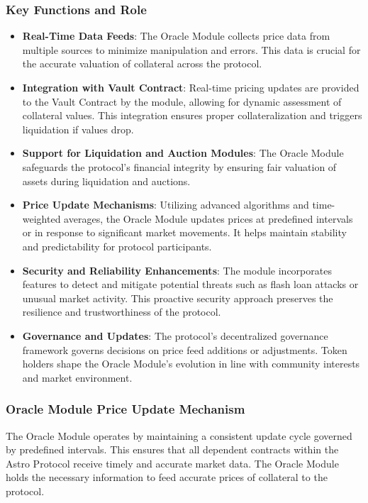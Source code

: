 \subsubsection{Key Functions and Role}
\begin{itemize}
    \item \textbf{Real-Time Data Feeds}: The Oracle Module collects price data from multiple sources to minimize manipulation and errors. This data is crucial for the accurate valuation of collateral across the protocol.
    \item \textbf{Integration with Vault Contract}: Real-time pricing updates are provided to the Vault Contract by the module, allowing for dynamic assessment of collateral values. This integration ensures proper collateralization and triggers liquidation if values drop.
    \item \textbf{Support for Liquidation and Auction Modules}: The Oracle Module safeguards the protocol's financial integrity by ensuring fair valuation of assets during liquidation and auctions.
    \item \textbf{Price Update Mechanisms}: Utilizing advanced algorithms and time-weighted averages, the Oracle Module updates prices at predefined intervals or in response to significant market movements. It helps maintain stability and predictability for protocol participants.
    \item \textbf{Security and Reliability Enhancements}: The module incorporates features to detect and mitigate potential threats such as flash loan attacks or unusual market activity. This proactive security approach preserves the resilience and trustworthiness of the protocol.
    \item \textbf{Governance and Updates}: The protocol's decentralized governance framework governs decisions on price feed additions or adjustments. Token holders shape the Oracle Module's evolution in line with community interests and market environment.
\end{itemize}

\subsubsection{Oracle Module Price Update Mechanism}
The Oracle Module operates by maintaining a consistent update cycle governed by predefined intervals. This ensures that all dependent contracts within the Astro Protocol receive timely and accurate market data. The Oracle Module holds the necessary information to feed accurate prices of collateral to the protocol.\\

